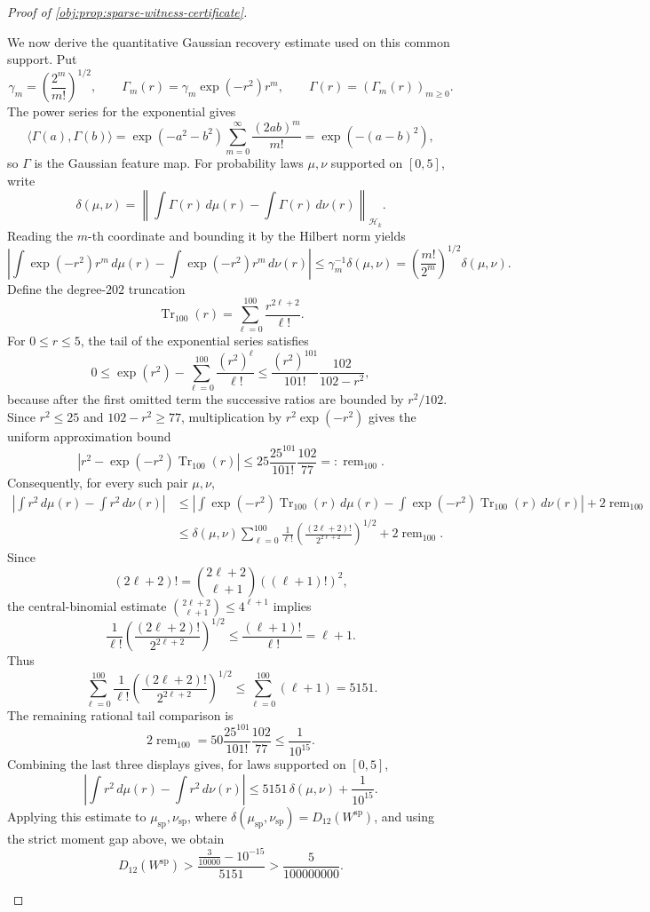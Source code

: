 \documentclass[11pt]{article}
\begin{document}
\begin{proof}[Proof of \cref{obj:prop:sparse-witness-certificate}]
\begin{enumerate}
We now derive the quantitative Gaussian recovery estimate used on this common support.  Put
\[
\gamma_m=\left(\frac{2^m}{m!}\right)^{1/2},
\qquad
\Gamma_m(r)=\gamma_m\exp(-r^2)r^m,
\qquad
\Gamma(r)=(\Gamma_m(r))_{m\ge0}.
\]
The power series for the exponential gives
\[
\langle \Gamma(a),\Gamma(b)\rangle
=
\exp(-a^2-b^2)\sum_{m=0}^\infty \frac{(2ab)^m}{m!}
=
\exp(-(a-b)^2),
\]
so \(\Gamma\) is the Gaussian feature map.  For probability laws \(\mu,\nu\) supported on \([0,5]\), write
\[
\delta(\mu,\nu)=
\left\|\int \Gamma(r)\,d\mu(r)-\int \Gamma(r)\,d\nu(r)\right\|_{\mathcal H_k}.
\]
Reading the \(m\)-th coordinate and bounding it by the Hilbert norm yields
\[
\left|
\int \exp(-r^2)r^m\,d\mu(r)-
\int \exp(-r^2)r^m\,d\nu(r)
\right|
\le
\gamma_m^{-1}\delta(\mu,\nu)
=
\left(\frac{m!}{2^m}\right)^{1/2}\delta(\mu,\nu).
\]
Define the degree-\(202\) truncation
\[
\operatorname{Tr}_{100}(r)=
\sum_{\ell=0}^{100}\frac{r^{2\ell+2}}{\ell!}.
\]
For \(0\le r\le5\), the tail of the exponential series satisfies
\[
0\le
\exp(r^2)-\sum_{\ell=0}^{100}\frac{(r^2)^\ell}{\ell!}
\le
\frac{(r^2)^{101}}{101!}\frac{102}{102-r^2},
\]
because after the first omitted term the successive ratios are bounded by \(r^2/102\).  Since \(r^2\le25\) and \(102-r^2\ge77\), multiplication by \(r^2\exp(-r^2)\) gives the uniform approximation bound
\[
\left|
 r^2-\exp(-r^2)\operatorname{Tr}_{100}(r)
\right|
\le
25\frac{25^{101}}{101!}\frac{102}{77}
=:\operatorname{rem}_{100}.
\]
Consequently, for every such pair \(\mu,\nu\),
\[
\begin{aligned}
\left|
\int r^2\,d\mu(r)-\int r^2\,d\nu(r)
\right|
&\le
\left|
\int \exp(-r^2)\operatorname{Tr}_{100}(r)\,d\mu(r)-
\int \exp(-r^2)\operatorname{Tr}_{100}(r)\,d\nu(r)
\right|
+2\operatorname{rem}_{100}  \\
&\le
\delta(\mu,\nu)
\sum_{\ell=0}^{100}
\frac1{\ell!}
\left(\frac{(2\ell+2)!}{2^{2\ell+2}}\right)^{1/2}
+2\operatorname{rem}_{100}.
\end{aligned}
\]
Since
\[
(2\ell+2)!=\binom{2\ell+2}{\ell+1}((\ell+1)!)^2,
\]
the central-binomial estimate \(\binom{2\ell+2}{\ell+1}\le 4^{\ell+1}\) implies
\[
\frac1{\ell!}
\left(\frac{(2\ell+2)!}{2^{2\ell+2}}\right)^{1/2}
\le
\frac{(\ell+1)!}{\ell!}
=
\ell+1.
\]
Thus
\[
\sum_{\ell=0}^{100}
\frac1{\ell!}
\left(\frac{(2\ell+2)!}{2^{2\ell+2}}\right)^{1/2}
\le
\sum_{\ell=0}^{100}(\ell+1)=5151.
\]
The remaining rational tail comparison is
\[
2\operatorname{rem}_{100}
=
50\frac{25^{101}}{101!}\frac{102}{77}
\le
\frac1{10^{15}}.
\]
Combining the last three displays gives, for laws supported on \([0,5]\),
\[
\left|
\int r^2\,d\mu(r)-\int r^2\,d\nu(r)
\right|
\le
5151\,\delta(\mu,\nu)+\frac1{10^{15}}.
\]
Applying this estimate to \(\mu_{\mathrm{sp}},\nu_{\mathrm{sp}}\), where \(\delta(\mu_{\mathrm{sp}},\nu_{\mathrm{sp}})=D_{12}(W^{\mathrm{sp}})\), and using the strict moment gap above, we obtain
\[
D_{12}(W^{\mathrm{sp}})
>
\frac{\frac3{10000}-10^{-15}}{5151}
>
\frac5{100000000}.
\]


\end{enumerate}
\end{proof}
\end{document}
